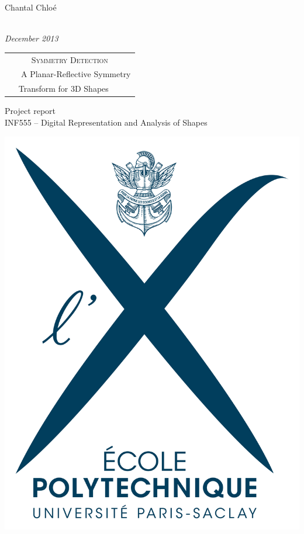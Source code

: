 \thispagestyle{empty}							%
%
	\begin{center}
		\hfill
		Chantal 
		\hfill \hfill
		Chloé \bsc{Macur}
		\hfill ~
		\par
		\noindent
		\\
		\vspace{0.7cm}
		\textit{December 2013}
		\vfill\vfill
		\Huge
		\begin{tabular}{c}
			\hline
			{\Large{\textsc{Symmetry Detection}}}\\
			~~~A Planar-Reflective Symmetry\\ Transform for 3D Shapes~~~\\
			\hline
		\end{tabular}
		\large
		\vfill
		 Project report\\
		 INF555 -- Digital Representation and Analysis of Shapes
	\end{center}
	\vfill
	\begin{flushright}
	\includegraphics[scale=0.1]{img/logo_x_h.jpg}
	\end{flushright}
	\newpage 